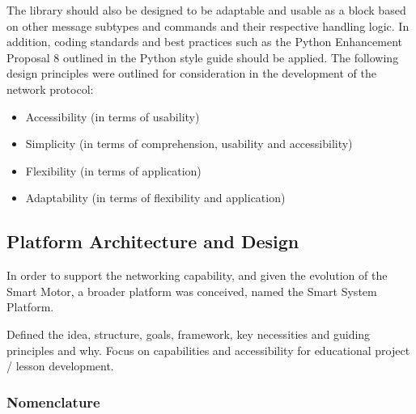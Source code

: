 The library should also be designed to be adaptable and usable as a block based on other message subtypes and commands and their respective handling logic.
In addition, coding standards and best practices such as the Python Enhancement Proposal 8 outlined in the Python style guide \citep{rossum_python_2001} should be applied. The following design principles were outlined for consideration in the development of the network protocol:
\begin{itemize}
    \item Accessibility (in terms of usability)
    \item Simplicity (in terms of comprehension, usability and accessibility)
    \item Flexibility (in terms of application)
    \item Adaptability (in terms of flexibility and application)
\end{itemize}

\subsection{\label{sec:methods_ssp_des}Platform Architecture and Design}

In order to support the networking capability, and given the evolution of the Smart Motor, a broader platform was conceived, named the Smart System Platform.

Defined the idea, structure, goals, framework, key necessities and guiding principles and why. 
Focus on capabilities and accessibility for educational project / lesson development. 
\subsubsection{\label{sec:methods_nomenclature}Nomenclature}

